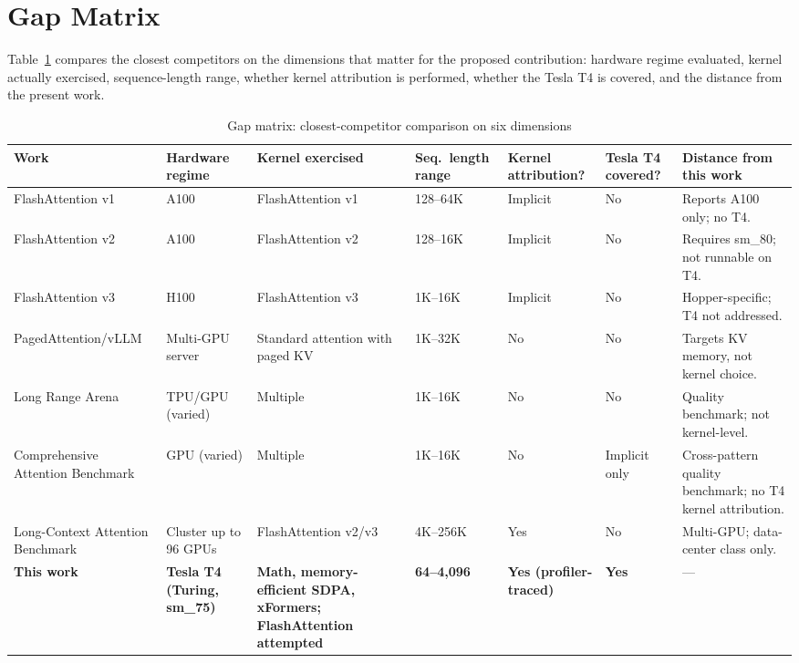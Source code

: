 \documentclass[11pt]{article}
\begin{document}
\section{Gap Matrix}

Table~\ref{tab:gap-matrix} compares the closest competitors on the dimensions that matter for the proposed contribution: hardware regime evaluated, kernel actually exercised, sequence-length range, whether kernel attribution is performed, whether the Tesla T4 is covered, and the distance from the present work.

\begin{table}[h!]
\centering
\caption{Gap matrix: closest-competitor comparison on six dimensions}
\label{tab:gap-matrix}
\footnotesize
\begin{tabularx}{\textwidth}{p{2.4cm} p{1.7cm} p{2.0cm} p{1.6cm} p{1.4cm} p{1.4cm} X}
\toprule
\textbf{Work} & \textbf{Hardware regime} & \textbf{Kernel exercised} & \textbf{Seq.\ length range} & \textbf{Kernel attribution?} & \textbf{Tesla T4 covered?} & \textbf{Distance from this work} \\
\midrule
FlashAttention v1 \cite{dao2022flashattentionfastmemoryefficientexact} & A100 & FlashAttention v1 & 128--64K & Implicit & No & Reports A100 only; no T4. \\
FlashAttention v2 \cite{dao2023flashattention2fasterattentionbetter} & A100 & FlashAttention v2 & 128--16K & Implicit & No & Requires sm\_80; not runnable on T4. \\
FlashAttention v3 \cite{shah2024flashattention3fastaccurateattention} & H100 & FlashAttention v3 & 1K--16K & Implicit & No & Hopper-specific; T4 not addressed. \\
PagedAttention/vLLM \cite{kwon2023efficientmemorymanagementlarge} & Multi-GPU server & Standard attention with paged KV & 1K--32K & No & No & Targets KV memory, not kernel choice. \\
Long Range Arena \cite{tay2020longrangearenabenchmark} & TPU/GPU (varied) & Multiple & 1K--16K & No & No & Quality benchmark; not kernel-level. \\
Comprehensive Attention Benchmark \cite{zhang2025cabcomprehensiveattentionbenchmarking} & GPU (varied) & Multiple & 1K--16K & No & Implicit only & Cross-pattern quality benchmark; no T4 kernel attribution. \\
Long-Context Attention Benchmark \cite{bu2025longcontextattentionbenchmark} & Cluster up to 96 GPUs & FlashAttention v2/v3 & 4K--256K & Yes & No & Multi-GPU; data-center class only. \\
\midrule
\textbf{This work} & \textbf{Tesla T4 (Turing, sm\_75)} & \textbf{Math, memory-efficient SDPA, xFormers; FlashAttention attempted} & \textbf{64--4{,}096} & \textbf{Yes (profiler-traced)} & \textbf{Yes} & --- \\
\bottomrule
\end{tabularx}
\end{table}
\end{document}
